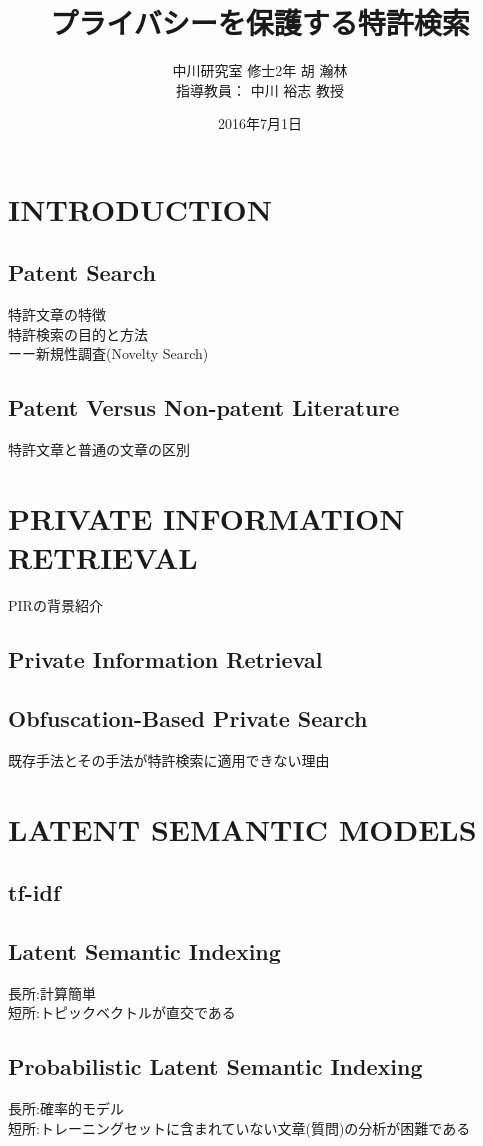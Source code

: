 \documentclass{jsarticle}
\title{プライバシーを保護する特許検索}
\author{中川研究室 修士2年 胡 瀚林\\指導教員： 中川 裕志 教授}
\date{2016年7月1日}
\theoremstyle{definition}
\begin{document}
\maketitle
\begin{abstract}
\end{abstract}


\section{INTRODUCTION}
\subsection{Patent Search}
特許文章の特徴\\
特許検索の目的と方法\\
ーー新規性調査(Novelty Search)
\subsection{Patent Versus Non-patent Literature}
特許文章と普通の文章の区別
\section{PRIVATE INFORMATION RETRIEVAL}
PIRの背景紹介
\subsection{Private Information Retrieval}
\subsection{Obfuscation-Based Private Search}
既存手法とその手法が特許検索に適用できない理由

\section{LATENT SEMANTIC MODELS}
\subsection{tf-idf}
\subsection{Latent Semantic Indexing}
長所:計算簡単\\
短所:トピックベクトルが直交である
\subsection{Probabilistic Latent Semantic Indexing}
長所:確率的モデル\\
短所:トレーニングセットに含まれていない文章(質問)の分析が困難である
\end{document}
